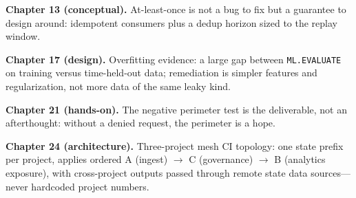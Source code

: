 \textbf{Chapter 13 (conceptual).} At-least-once is not a bug to fix but a guarantee to design
around: idempotent consumers plus a dedup horizon sized to the replay window.

\textbf{Chapter 17 (design).} Overfitting evidence: a large gap between \texttt{ML.EVALUATE} on
training versus time-held-out data; remediation is simpler features and regularization, not more
data of the same leaky kind.

\textbf{Chapter 21 (hands-on).} The negative perimeter test is the deliverable, not an afterthought:
without a denied request, the perimeter is a hope.

\textbf{Chapter 24 (architecture).} Three-project mesh CI topology: one state prefix per project,
applies ordered A (ingest) $\rightarrow$ C (governance) $\rightarrow$ B (analytics exposure), with
cross-project outputs passed through remote state data sources---never hardcoded project numbers.
